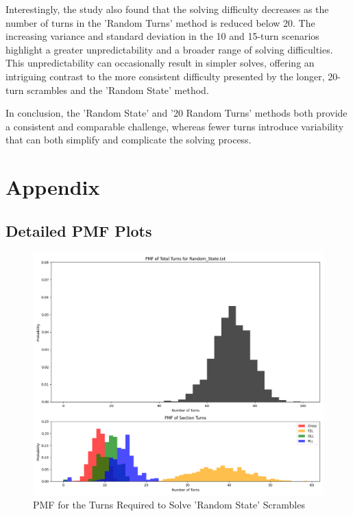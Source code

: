 \documentclass[12pt,letterpaper]{article}
\numberwithin{equation}{section}
\begin{document}
Interestingly, the study also found that the solving difficulty decreases as the number of turns in the 'Random Turns' method is reduced below 20. The increasing variance and standard deviation in the 10 and 15-turn scenarios highlight a greater unpredictability and a broader range of solving difficulties. This unpredictability can occasionally result in simpler solves, offering an intriguing contrast to the more consistent difficulty presented by the longer, 20-turn scrambles and the 'Random State' method.

In conclusion, the 'Random State' and '20 Random Turns' methods both provide a consistent and comparable challenge, whereas fewer turns introduce variability that can both simplify and complicate the solving process.













\newpage


\section{Appendix}

\subsection{Detailed PMF Plots}

	\begin{figure}[H]
		\centering
		 \includegraphics[width=6in]{pmf_random_state.png}
		 \caption{PMF for the Turns Required to Solve 'Random State' Scrambles}
		 \label{fig:pmf_random_state}
	\end{figure}
	
\end{document}
